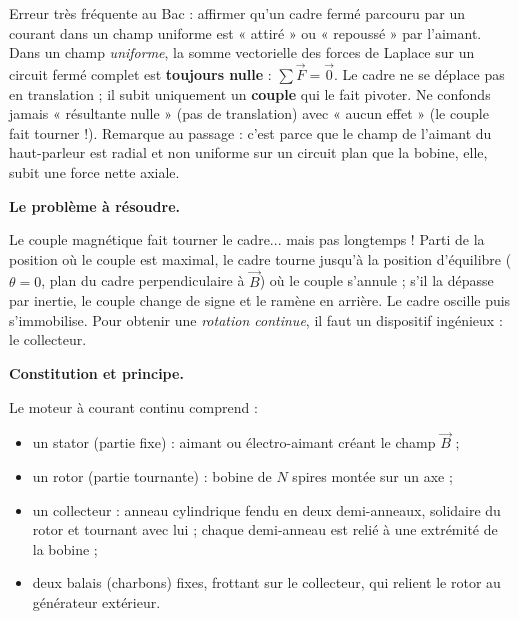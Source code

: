 \documentclass[11pt]{article}
\newcommand{\cle}[1]{{\popxbold\color{popdark}#1}}
\newcounter{popsec}
\newcounter{popsub}
\newcommand{\courssub}[1]{%
  \stepcounter{popsub}%
  \par\vspace{9pt}\noindent{\popxbold\fontsize{11.5}{13}\selectfont\color{popink}{\color{poporange}\thepopsec.\thepopsub}\hspace{6pt}#1}\par\nopagebreak\vspace{4pt}
}
\begin{document}
\begin{attention}
Erreur très fréquente au Bac : affirmer qu'un cadre fermé parcouru par un courant dans un champ uniforme est « attiré » ou « repoussé » par l'aimant. Dans un champ \emph{uniforme}, la somme vectorielle des forces de Laplace sur un circuit fermé complet est \textbf{toujours nulle} : $\sum \vec{F} = \vec{0}$. Le cadre ne se déplace pas en translation ; il subit uniquement un \textbf{couple} qui le fait pivoter. Ne confonds jamais « résultante nulle » (pas de translation) avec « aucun effet » (le couple fait tourner !). Remarque au passage : c'est parce que le champ de l'aimant du haut-parleur est radial et non uniforme sur un circuit plan que la bobine, elle, subit une force nette axiale.
\end{attention}

\courssub{Le moteur à courant continu}

\textbf{Le problème à résoudre.}\par
Le couple magnétique fait tourner le cadre... mais pas longtemps ! Parti de la position où le couple est maximal, le cadre tourne jusqu'à la position d'équilibre ($\theta = 0$, plan du cadre perpendiculaire à $\vec{B}$) où le couple s'annule ; s'il la dépasse par inertie, le couple change de signe et le ramène en arrière. Le cadre oscille puis s'immobilise. Pour obtenir une \emph{rotation continue}, il faut un dispositif ingénieux : le \cle{collecteur}.

\textbf{Constitution et principe.}\par
Le moteur à courant continu comprend :
\begin{itemize}
\item un \cle{stator} (partie fixe) : aimant ou électro-aimant créant le champ $\vec{B}$ ;
\item un \cle{rotor} (partie tournante) : bobine de $N$ spires montée sur un axe ;
\item un \cle{collecteur} : anneau cylindrique fendu en deux demi-anneaux, solidaire du rotor et tournant avec lui ; chaque demi-anneau est relié à une extrémité de la bobine ;
\item deux \cle{balais} (charbons) fixes, frottant sur le collecteur, qui relient le rotor au générateur extérieur.
\end{itemize}
\end{document}
